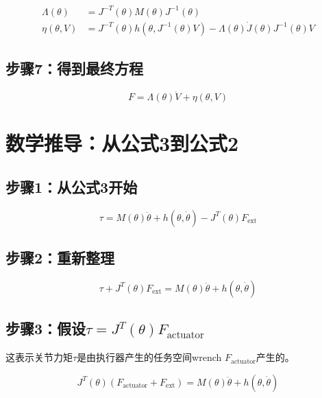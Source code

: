 \documentclass[12pt,a4paper]{article}
\begin{document}
\begin{align}
\Lambda(\theta) &= J^{-T}(\theta)M(\theta)J^{-1}(\theta) \tag{8.90} \\
\eta(\theta, V) &= J^{-T}(\theta)h(\theta, J^{-1}(\theta)V) - \Lambda(\theta)\dot{J}(\theta)J^{-1}(\theta)V \tag{8.91}
\end{align}

\subsection{步骤7：得到最终方程}

\begin{equation}
F = \Lambda(\theta)\dot{V} + \eta(\theta, V) \tag{8.89}
\end{equation}

\section{数学推导：从公式3到公式2}

\subsection{步骤1：从公式3开始}

\begin{equation}
\tau = M(\theta)\ddot{\theta} + h(\theta, \dot{\theta}) - J^T(\theta)F_{\text{ext}} \tag{1}
\end{equation}

\subsection{步骤2：重新整理}

\begin{equation}
\tau + J^T(\theta)F_{\text{ext}} = M(\theta)\ddot{\theta} + h(\theta, \dot{\theta})
\end{equation}

\subsection{步骤3：假设$\tau = J^T(\theta)F_{\text{actuator}}$}

这表示关节力矩$\tau$是由执行器产生的任务空间wrench $F_{\text{actuator}}$产生的。

\begin{equation}
J^T(\theta)(F_{\text{actuator}} + F_{\text{ext}}) = M(\theta)\ddot{\theta} + h(\theta, \dot{\theta})
\end{equation}
\end{document}
